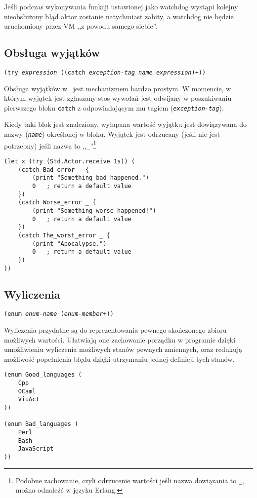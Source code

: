 Jeśli podczas wykonywania funkcji ustawionej jako watchdog wystąpi kolejny nieobsłużony błąd aktor zostanie
natychmiast zabity, a watchdog nie będzie uruchomiony przez VM ,,z powodu samego siebie''.

\subsection{Obsługa wyjątków}

\texttt{(try \emph{expression} ((catch \emph{exception-tag} \emph{name} \emph{expression})+))}
\vspace{1em}

Obsługa wyjątków w \ViuAct\ jest mechanizmem bardzo prostym. W momencie, w którym wyjątek jest zgłaszany
stos wywołań jest odwijany w poszukiwaniu pierwszego bloku \texttt{catch} z odpowiadającym mu
tagiem (\texttt{\emph{exception-tag}}).

Kiedy taki blok jest znaleziony, wyłapana wartość wyjątku jest dowiązywana do nazwy (\texttt{\emph{name}})
określonej w bloku. Wyjątek jest odrzucany (jeśli nie jest potrzebny) jeśli nazwa to
,,\texttt{\_}''\footnote{Podobne zachowanie, czyli odrzucenie wartości jeśli nazwa dowiązania to
\texttt{\_}, można odnaleźć w języku Erlang.}

\begin{lstlisting}
(let x (try (Std.Actor.receive 1s)) (
    (catch Bad_error _ {
        (print "Something bad happened.")
        0   ; return a default value
    })
    (catch Worse_error _ {
        (print "Something worse happened!")
        0   ; return a default value
    })
    (catch The_worst_error _ {
        (print "Apocalypse.")
        0   ; return a default value
    })
))
\end{lstlisting}

\subsection{Wyliczenia}

\texttt{(enum \emph{enum-name} (\emph{enum-member}+))}
\newline

Wyliczenia przydatne są do reprezentowania pewnego skończonego zbioru możliwych wartości. Ułatwiają one
zachowanie porządku w programie dzięki umożliwieniu wyliczenia możliwych stanów pewnych zmiennych, oraz
redukują możliwość popełnienia błędu dzięki utrzymaniu jednej definicji tych stanów.

\begin{lstlisting}
(enum Good_languages (
    Cpp
    OCaml
    ViuAct
))

(enum Bad_languages (
    Perl
    Bash
    JavaScript
))
\end{lstlisting}

